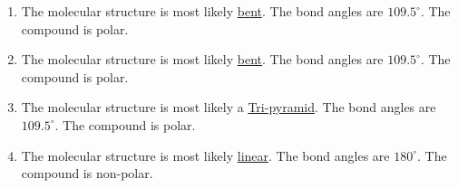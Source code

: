 \documentclass[12pt]{article}
\begin{document}
\begin{enumerate}
\begin{enumerate}
      \item {}

        \vspace{5pt}
        \begin{multicols}{2}
          \hspace{110pt}\hspace{20pt}
          The molecular structure is most likely \underline{bent}. The bond angles are $109.5^{\circ}$. The compound is polar.
      \end{multicols}
        \vspace{5pt}

      \item {}

        \vspace{5pt}
        \begin{multicols}{2}
          \hspace{110pt}\hspace{20pt}
          The molecular structure is most likely \underline{bent}. The bond angles are $109.5^{\circ}$. The compound is polar.
      \end{multicols}
        \vspace{5pt}

      \item {}

        \vspace{5pt}
        \begin{multicols}{2}
          \hspace{100pt}\hspace{20pt}
          The molecular structure is most likely a \underline{Tri-pyramid}. The bond angles are $109.5^{\circ}$. The compound is polar.
      \end{multicols}
        \vspace{5pt}

      \item {}

        \vspace{5pt}
        \begin{multicols}{2}
          \hspace{110pt}\hspace{20pt}
          The molecular structure is most likely \underline{linear}. The bond angles are $180^{\circ}$. The compound is non-polar.
      \end{multicols}
        \vspace{5pt}


\end{enumerate}
\end{enumerate}
\end{document}
